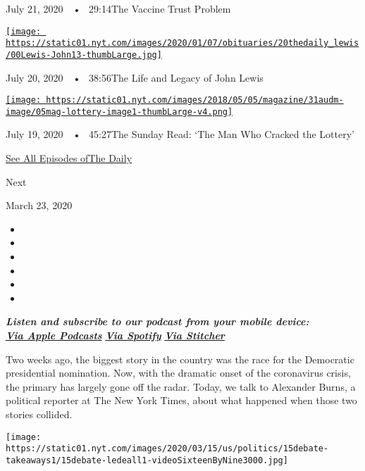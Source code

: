 July 21, 2020~~•~ 29:14The Vaccine Trust Problem

\href{https://www.nytimes.com/2020/07/20/podcasts/the-daily/john-lewis.html?action=click\&module=audio-series-bar\&region=header\&pgtype=Article}{\texttt{[image: https://static01.nyt.com/images/2020/01/07/obituaries/20thedaily\_lewis/00Lewis-John13-thumbLarge.jpg]}}

July 20, 2020~~•~ 38:56The Life and Legacy of John Lewis

\href{https://www.nytimes.com/2020/07/19/podcasts/the-daily/lottery-winner-scam.html?action=click\&module=audio-series-bar\&region=header\&pgtype=Article}{\texttt{[image: https://static01.nyt.com/images/2018/05/05/magazine/31audm-image/05mag-lottery-image1-thumbLarge-v4.png]}}

July 19, 2020~~•~ 45:27The Sunday Read: `The Man Who Cracked the
Lottery'

\href{https://www.nytimes.com/column/the-daily}{See All Episodes ofThe
Daily}

Next

March 23, 2020

\begin{itemize}
\item
\item
\item
\item
\item
\item
\end{itemize}

\emph{\textbf{Listen and subscribe to our podcast from your mobile
device:}}\\
\textbf{\href{https://itunes.apple.com/us/podcast/the-daily/id1200361736?mt=2}{\emph{Via
Apple Podcasts}}} \emph{\textbf{\textbar{}}}
\textbf{\href{https://open.spotify.com/show/3IM0lmZxpFAY7CwMuv9H4g?si=SfuMSC55R1qprFsRZU3_zw}{\emph{Via
Spotify}}} \emph{\textbf{\textbar{}}}
\textbf{\href{http://www.stitcher.com/podcast/the-new-york-times/the-daily-10}{\emph{Via
Stitcher}}}

Two weeks ago, the biggest story in the country was the race for the
Democratic presidential nomination. Now, with the dramatic onset of the
coronavirus crisis, the primary has largely gone off the radar. Today,
we talk to Alexander Burns, a political reporter at The New York Times,
about what happened when those two stories collided.

\texttt{[image: https://static01.nyt.com/images/2020/03/15/us/politics/15debate-takeaways1/15debate-ledeall1-videoSixteenByNine3000.jpg]}


